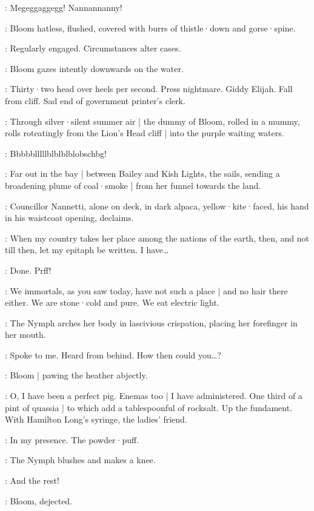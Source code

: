 \Nannygoat:
Megeggaggegg!
Nannannanny!

:
Bloom hatless,
flushed,
covered with burrs of thistle·down and gorse·spine.

\Bloom:
Regularly engaged.
Circumstances alter cases.

:
Bloom gazes intently downwards on the water.

\Bloom:
Thirty·two head over heels per second.
Press nightmare.
Giddy Elijah.
Fall from cliff.
Sad end of government printer's clerk.

:
Through silver·silent summer air |
the dummy of Bloom,
rolled in a mummy,
rolls roteatingly from the Lion's Head cliff |
into the purple waiting waters.

\Dummymummy[3b]:
Bbbbblllllblblblblobschbg!

:
Far out in the bay |
between Bailey and Kish Lights,
the  sails,
sending a broadening plume of coal·smoke |
from her funnel towards the land.

:
Councillor Nannetti,
alone on deck,
in dark alpaca,
yellow·kite·faced,
his hand in his waistcoat opening,
declaims.

\CouncillorNannetti:
When my country takes her place among the nations of the earth,
then,
and not till then,
let my epitaph be written.
I have…

\Bloom:
Done.
Prff!
%

\Nymph:
We immortals,
as you saw today,
have not such a place |
and no hair there either.
We are stone·cold and pure.
We eat electric light.

:
The Nymph arches her body in lascivious crispation,
placing her forefinger in her mouth.

\Nymph:
Spoke to me.
Heard from behind.
How then could you…?

:
Bloom |
pawing the heather abjectly.

\Bloom:
O,
I have been a perfect pig.
Enemas too |
I have administered.
One third of a pint of quassia |
to which add a tablespoonful of rocksalt.
Up the fundament.
With Hamilton Long's syringe,
the ladies' friend.%

\Nymph:
In my presence.
The powder·puff.

:
The Nymph blushes and makes a knee.

\Nymph:
And the rest!

:
Bloom,
dejected.

